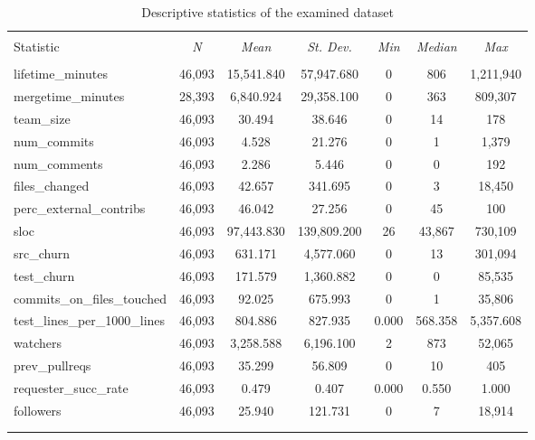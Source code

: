 \documentclass{sig-alternate}
\begin{document}
\begin{table*}[htb] \centering 
  \caption{Descriptive statistics of the examined dataset} 
\footnotesize 
\begin{tabular}{@{\extracolsep{5pt}}l c c c c c c } 
\\[-1.8ex]\hline 
\hline \\[-1.8ex] 
Statistic & \multicolumn{1}{c}{\textit{N}} & \multicolumn{1}{c}{\textit{Mean}} & \multicolumn{1}{c}{\textit{St. Dev.}} & \multicolumn{1}{c}{\textit{Min}} & \multicolumn{1}{c}{\textit{Median}} & \multicolumn{1}{c}{\textit{Max}} \\ 
\hline \\[-1.8ex] 
lifetime\_minutes & 46,093 & 15,541.840 & 57,947.680 & 0 & 806 & 1,211,940 \\ 
mergetime\_minutes & 28,393 & 6,840.924 & 29,358.100 & 0 & 363 & 809,307 \\ 
team\_size & 46,093 & 30.494 & 38.646 & 0 & 14 & 178 \\ 
num\_commits & 46,093 & 4.528 & 21.276 & 0 & 1 & 1,379 \\ 
num\_comments & 46,093 & 2.286 & 5.446 & 0 & 0 & 192 \\ 
files\_changed & 46,093 & 42.657 & 341.695 & 0 & 3 & 18,450 \\ 
perc\_external\_contribs & 46,093 & 46.042 & 27.256 & 0 & 45 & 100 \\ 
sloc & 46,093 & 97,443.830 & 139,809.200 & 26 & 43,867 & 730,109 \\ 
src\_churn & 46,093 & 631.171 & 4,577.060 & 0 & 13 & 301,094 \\ 
test\_churn & 46,093 & 171.579 & 1,360.882 & 0 & 0 & 85,535 \\ 
commits\_on\_files\_touched & 46,093 & 92.025 & 675.993 & 0 & 1 & 35,806 \\ 
test\_lines\_per\_1000\_lines & 46,093 & 804.886 & 827.935 & 0.000 & 568.358 & 5,357.608 \\ 
watchers & 46,093 & 3,258.588 & 6,196.100 & 2 & 873 & 52,065 \\ 
prev\_pullreqs & 46,093 & 35.299 & 56.809 & 0 & 10 & 405 \\ 
requester\_succ\_rate & 46,093 & 0.479 & 0.407 & 0.000 & 0.550 & 1.000 \\ 
followers & 46,093 & 25.940 & 121.731 & 0 & 7 & 18,914 \\ 
\hline \\[-1.8ex] 
\normalsize 
\end{tabular} 
\end{table*} 
\end{document}
